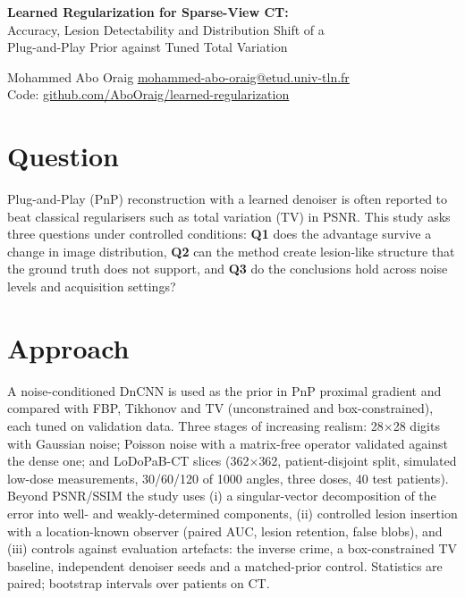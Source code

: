 \documentclass[10pt,a4paper]{article}
\begin{document}
\pagestyle{empty}

\begin{center}
    {\Large \textbf{Learned Regularization for Sparse-View CT:}}\\
    {\large Accuracy, Lesion Detectability and Distribution Shift of a\\
    Plug-and-Play Prior against Tuned Total Variation}
\end{center}
Mohammed Abo Oraig \quad\textbar\quad \href{mailto:mohammed-abo-oraig@etud.univ-tln.fr}{\underline{mohammed-abo-oraig@etud.univ-tln.fr}} \\
Code: \href{https://github.com/AboOraig/learned-regularization}{\underline{github.com/AboOraig/learned-regularization}}

\section*{Question}
Plug-and-Play (PnP) reconstruction with a learned denoiser is often reported to beat classical regularisers such as total variation (TV) in PSNR.
This study asks three questions under controlled conditions: \textbf{Q1} does the advantage survive a change in image distribution,
\textbf{Q2} can the method create lesion-like structure that the ground truth does not support, and \textbf{Q3} do the conclusions hold across noise levels and acquisition settings?

\section*{Approach}
A noise-conditioned DnCNN is used as the prior in PnP proximal gradient and compared with FBP, Tikhonov and TV (unconstrained and box-constrained), each tuned on validation data.
Three stages of increasing realism: 28$\times$28 digits with Gaussian noise; Poisson noise with a matrix-free operator validated against the dense one;
and LoDoPaB-CT slices (362$\times$362, patient-disjoint split, simulated low-dose measurements, 30/60/120 of 1000 angles, three doses, 40 test patients).
Beyond PSNR/SSIM the study uses (i) a singular-vector decomposition of the error into well- and weakly-determined components, (ii) controlled lesion insertion with a location-known observer (paired AUC, lesion retention, false blobs),
and (iii) controls against evaluation artefacts: the inverse crime, a box-constrained TV baseline, independent denoiser seeds and a matched-prior control.
Statistics are paired; bootstrap intervals over patients on CT.
\end{document}

